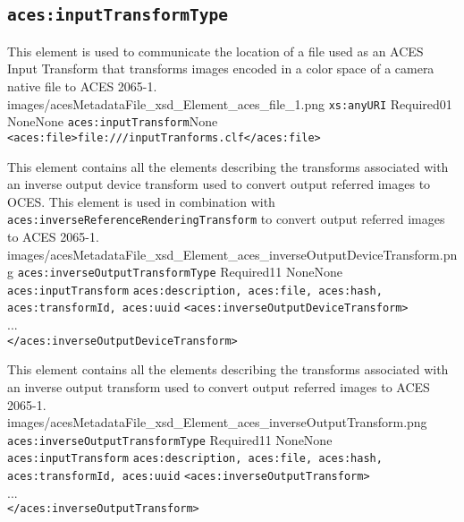 \subsection{\texttt{aces:inputTransformType}}

		{This element is used to communicate the location of a file used as an ACES Input Transform that transforms images encoded in a color space of a camera native file to ACES 2065-1.}
		{images/acesMetadataFile_xsd_Element_aces_file_1.png}
		{\texttt{xs:anyURI}}
		{Required}{0}{1}
		{None}{None}
		{\texttt{aces:inputTransform}}{None}
		{\lstinline{<aces:file>file:///inputTranforms.clf</aces:file>}}
		
        {This element contains all the elements describing the transforms associated with an inverse output device transform used to convert output referred images to OCES.  This element is used in combination with \texttt{aces:inverseReferenceRenderingTransform} to convert output referred images to ACES 2065-1.}
        {images/acesMetadataFile_xsd_Element_aces_inverseOutputDeviceTransform.png}
        {\texttt{aces:inverseOutputTransformType}}
        {Required}{1}{1}
        {None}{None}
        {\texttt{aces:inputTransform}}
        {\texttt{aces:description, aces:file, aces:hash, aces:transformId, aces:uuid}}
        {\lstinline{<aces:inverseOutputDeviceTransform>} \\
        ... \\
        \lstinline{</aces:inverseOutputDeviceTransform>}}
        
        {This element contains all the elements describing the transforms associated with an inverse output transform used to convert output referred images to ACES 2065-1.}
        {images/acesMetadataFile_xsd_Element_aces_inverseOutputTransform.png}
        {\texttt{aces:inverseOutputTransformType}}
        {Required}{1}{1}
        {None}{None}
        {\texttt{aces:inputTransform}}
        {\texttt{aces:description, aces:file, aces:hash, aces:transformId, aces:uuid}}
        {\lstinline{<aces:inverseOutputTransform>} \\
        ... \\
        \lstinline{</aces:inverseOutputTransform>}}
        
